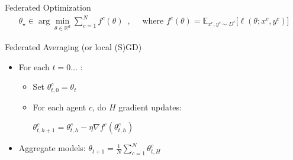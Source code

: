 \documentclass[aspectratio=169,14pt]{beamer}
\begin{document}
\begin{frame}[t]{Federated Optimization}
  \vspace{-3em}
  \begin{align*}
    \theta_\star \in \arg\min_{\theta \in \mathbb{R}^d} 
    \sum_{c=1}^N f^c(\theta)
    \enspace,
    \quad
    \text{ where }
    f^c(\theta) = \mathbb{E}_{x^c, y^c \sim D^c} \Big[ \ell( \theta; x^c, y^c ) \Big]
  \end{align*}

  \pause
  
  \vspace{-1em}

  Federated Averaging (or local (S)GD)

  \vspace{-0.5em}
  
  \begin{itemize}
  \item For each $t = 0 ...$ :
    \begin{itemize}
      \normalsize
    \item Set $\theta_{t,0}^c = \theta_t$
    \item For each agent $c$, do $H$ gradient updates: \\[0.5em]
      
      \begin{center}
        $\theta_{t,h+1}^c = \theta_{t,h}^c - \eta \nabla f^c( \theta_{t,h}^c )$
      \end{center}
      
      \vspace{0.5em}
      
    \end{itemize}
  \item Aggregate models: $\theta_{t+1} = \frac{1}{N} \sum_{c=1}^N \theta_{t,H}^c$
  \end{itemize}

  \vspace{0.5em}

\end{frame}

  


  
\end{document}
